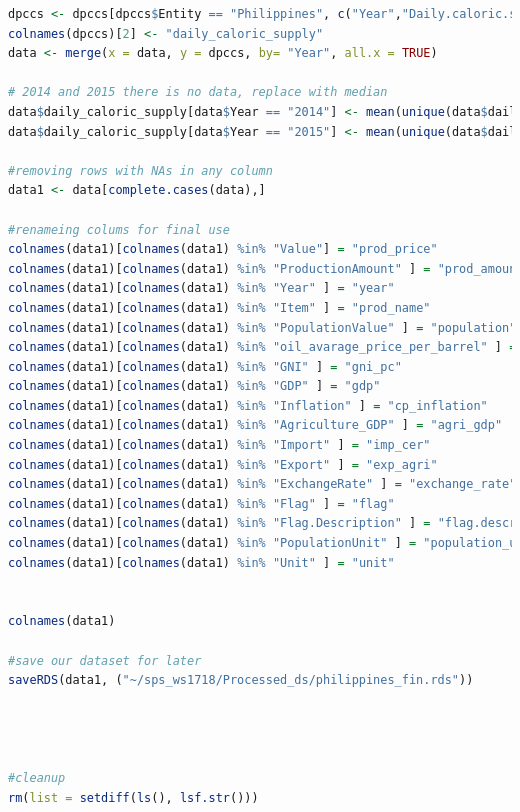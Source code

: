 \documentclass[11pt]{article}
\begin{document}
\begin{lstlisting}[language= R]
dpccs <- dpccs[dpccs$Entity == "Philippines", c("Year","Daily.caloric.supply..FAO..2017....kcal.person.day.")]
colnames(dpccs)[2] <- "daily_caloric_supply"
data <- merge(x = data, y = dpccs, by= "Year", all.x = TRUE)

# 2014 and 2015 there is no data, replace with median 
data$daily_caloric_supply[data$Year == "2014"] <- mean(unique(data$daily_caloric_supply[data$Year %in% c("2012", "2011", "2010", "2009", "2008")]))
data$daily_caloric_supply[data$Year == "2015"] <- mean(unique(data$daily_caloric_supply[data$Year %in% c("2013" ,"2012", "2011", "2010", "2009")]))

#removing rows with NAs in any column
data1 <- data[complete.cases(data),]

#renameing colums for final use
colnames(data1)[colnames(data1) %in% "Value"] = "prod_price"
colnames(data1)[colnames(data1) %in% "ProductionAmount" ] = "prod_amount"
colnames(data1)[colnames(data1) %in% "Year" ] = "year"
colnames(data1)[colnames(data1) %in% "Item" ] = "prod_name"
colnames(data1)[colnames(data1) %in% "PopulationValue" ] = "population"
colnames(data1)[colnames(data1) %in% "oil_avarage_price_per_barrel" ] = "avg_p_barrel"
colnames(data1)[colnames(data1) %in% "GNI" ] = "gni_pc"
colnames(data1)[colnames(data1) %in% "GDP" ] = "gdp"
colnames(data1)[colnames(data1) %in% "Inflation" ] = "cp_inflation"
colnames(data1)[colnames(data1) %in% "Agriculture_GDP" ] = "agri_gdp"
colnames(data1)[colnames(data1) %in% "Import" ] = "imp_cer"
colnames(data1)[colnames(data1) %in% "Export" ] = "exp_agri"
colnames(data1)[colnames(data1) %in% "ExchangeRate" ] = "exchange_rate"
colnames(data1)[colnames(data1) %in% "Flag" ] = "flag"
colnames(data1)[colnames(data1) %in% "Flag.Description" ] = "flag.description"
colnames(data1)[colnames(data1) %in% "PopulationUnit" ] = "population_unit"
colnames(data1)[colnames(data1) %in% "Unit" ] = "unit"


colnames(data1)

#save our dataset for later
saveRDS(data1, ("~/sps_ws1718/Processed_ds/philippines_fin.rds"))




#cleanup
rm(list = setdiff(ls(), lsf.str()))
\end{lstlisting}
\end{document}
